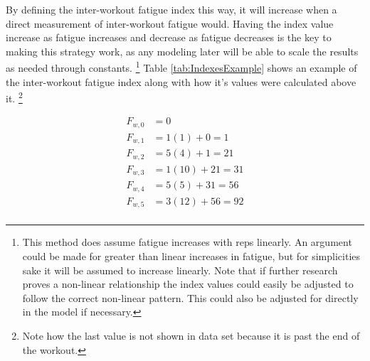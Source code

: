 By defining the inter-workout fatigue index this way, it will increase when a direct measurement of inter-workout fatigue would. Having the index value increase as fatigue increases and decrease as fatigue decreases is the key to making this strategy work, as any modeling later will be able to scale the results as needed through constants. \footnote{This method does assume fatigue increases with reps linearly. An argument could be made for greater than linear increases in fatigue, but for simplicities sake it will be assumed to increase linearly. Note that if further research proves a non-linear relationship the index values could easily be adjusted to follow the correct non-linear pattern. This could also be adjusted for directly in the model if necessary.} Table \ref{tab:IndexesExample} shows an example of the inter-workout fatigue index along with how it's values were calculated above it. \footnote{Note how the last value is not shown in data set because it is past the end of the workout.}

\begin{equation*}
	\begin{aligned}
		F_{w,0} & =0 \\
		F_{w,1} & =1(1)+0=1 \\
		F_{w,2} & =5(4)+1=21 \\
		F_{w,3} & =1(10)+21=31 \\
		F_{w,4} & =5(5)+31=56 \\
		F_{w,5} & =3(12)+56=92  \\
	\end{aligned}
\end{equation*}

